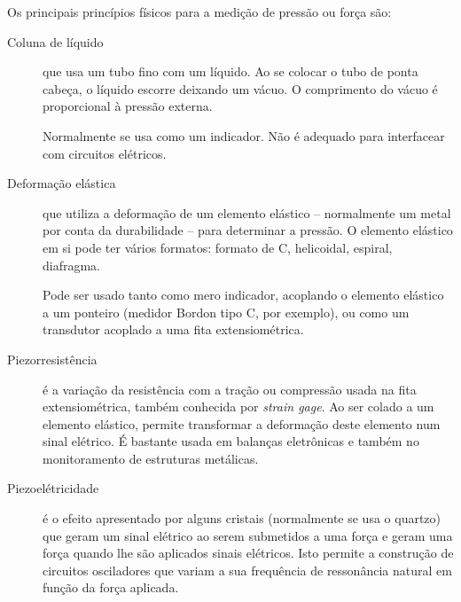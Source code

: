Os principais princípios físicos para a medição de pressão ou força são:
\begin{description}
  \item[Coluna de líquido] que usa um tubo fino com um líquido. Ao se colocar o tubo de ponta cabeça, o líquido escorre deixando um vácuo. O comprimento do vácuo é proporcional à pressão externa.

  Normalmente se usa como um indicador. Não é adequado para interfacear com circuitos elétricos.

  \item[Deformação elástica] que utiliza a deformação de um elemento elástico -- normalmente um metal por conta da durabilidade -- para determinar a pressão. O elemento elástico em si pode ter vários formatos: formato de C, helicoidal, espiral, diafragma.

Pode ser usado tanto como mero indicador, acoplando o elemento elástico a um ponteiro (medidor Bordon tipo C, por exemplo), ou como um transdutor acoplado a uma fita extensiométrica.

  \item[Piezorresistência] é a variação da resistência com a tração ou compressão usada na fita extensiométrica, também conhecida por \emph{strain gage}. Ao ser colado a um elemento elástico, permite transformar a deformação deste elemento num sinal elétrico. É bastante usada em balanças eletrônicas e também no monitoramento de estruturas metálicas.

  \item[Piezoelétricidade] é o efeito apresentado por alguns cristais (normalmente se usa o quartzo) que geram um sinal elétrico ao serem submetidos a uma força e geram uma força quando lhe são aplicados sinais elétricos. Isto permite a construção de circuitos osciladores que variam a sua frequência de ressonância natural em função da força aplicada.
\end{description}

